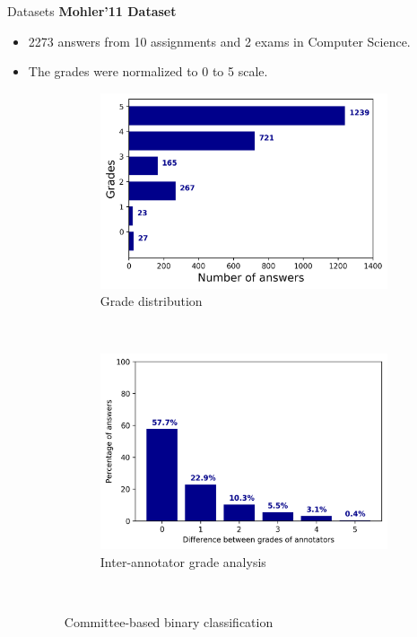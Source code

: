 \documentclass{beamer}
\begin{document}
\begin{frame}{Datasets}
\textbf{Mohler'11 Dataset \cite{Mohler2011}}
	\begin{itemize}
	\item 2273 answers from 10 assignments and 2 exams in Computer Science.
	\item The grades were normalized to 0 to 5 scale.	
	
		\begin{figure}[!htb]
			\begin{subfigure}[b]{0.35\textwidth}
				\includegraphics[width=\textwidth]{images/mohlergrades}
				\caption{Grade distribution}
				\label{mohlergrades}
			\end{subfigure}
			~
			\begin{subfigure}[b]{0.35\textwidth}
				\includegraphics[width=\textwidth]{images/mohlerdisagreement}
				\caption{Inter-annotator grade analysis\cite{Mohler2011}}
				\label{mohlerdisagreement}
			\end{subfigure}
			~
			\caption{Committee-based binary classification}
		\end{figure}
	\end{itemize}
\end{frame}
\end{document}
